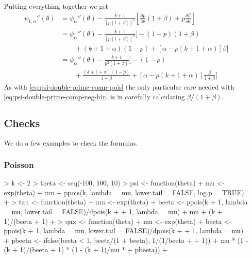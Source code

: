 \documentclass[11pt]{article}
\begin{document}
Putting everything together we get
\begin{equation} \label{eq:psi-double-prime-comp-neg-bin}
\begin{split}
   \psi_{k, \alpha}''(\theta)
   & =
   \psi_\alpha''(\theta)
   -
   \frac{k + 1}{[p (1 + \beta)]^2}
   \left[ \frac{\partial p}{\partial \theta} (1 + \beta)
   +
   p \frac{\partial \beta}{\partial \theta} \right]
   \\
   & =
   \psi_\alpha''(\theta)
   -
   \frac{k + 1}{[p (1 + \beta)]^2}
   \bigl[ - (1 - p) (1 + \beta)
   \\
   & \qquad
   +
   (k + 1 + \alpha) (1 - p) +
   [ \alpha - p (k + 1 + \alpha) ]
   \beta
   \bigr]
   \\
   & =
   \psi_\alpha''(\theta)
   -
   \frac{k + 1}{p^2 (1 + \beta)}
   \biggl[ - (1 - p)
   \\
   & \qquad
   +
   \frac{(k + 1 + \alpha) (1 - p)}{1 + \beta}
   +
   [ \alpha - p (k + 1 + \alpha) ]
   \frac{\beta}{1 + \beta}
   \biggr]
\end{split}
\end{equation}
As with \eqref{eq:psi-double-prime-comp-pois}
the only particular care needed with \eqref{eq:psi-double-prime-comp-neg-bin}
is in carefully calculating $\beta / (1 + \beta)$.

\subsection{Checks} \label{sec:check}

We do a few examples to check the formulas.

\subsubsection{Poisson}

\begin{Schunk}
\begin{Sinput}
> k <- 2
> theta <- seq(-100, 100, 10)
> psi <- function(theta) {
+     mu <- exp(theta)
+     mu + ppois(k, lambda = mu, lower.tail = FALSE, log.p = TRUE)
+ }
> tau <- function(theta) {
+     mu <- exp(theta)
+     beeta <- ppois(k + 1, lambda = mu, lower.tail = FALSE)/dpois(k + 
+         1, lambda = mu)
+     mu + (k + 1)/(beeta + 1)
+ }
> qux <- function(theta) {
+     mu <- exp(theta)
+     beeta <- ppois(k + 1, lambda = mu, lower.tail = FALSE)/dpois(k + 
+         1, lambda = mu)
+     pbeeta <- ifelse(beeta < 1, beeta/(1 + beeta), 1/(1/beeta + 
+         1))
+     mu * (1 - (k + 1)/(beeta + 1) * (1 - (k + 1)/mu * 
+         pbeeta))
+ }
\end{Sinput}
\end{Schunk}
\end{document}

